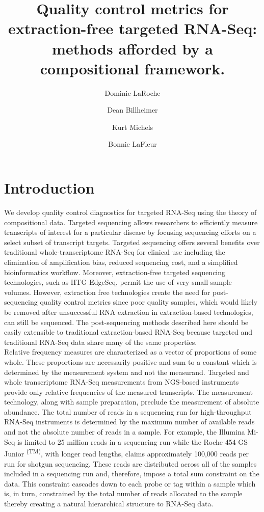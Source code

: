 \documentclass{article}\usepackage[]{graphicx}\usepackage[]{color}
\title{Quality control metrics for extraction-free targeted RNA-Seq: methods afforded by a compositional framework.}
\author{Dominic LaRoche \and Dean Billheimer \and Kurt Michels \and  Bonnie LaFleur}
\theoremstyle{definition}
\begin{document}
\maketitle

\doublespacing


\section{Introduction}


We develop quality control diagnostics for targeted RNA-Seq using the theory of compositional data.  Targeted sequencing allows researchers to efficiently measure transcripts of interest for a particular disease by focusing sequencing efforts on a select subset of transcript targets.  Targeted sequencing offers several benefits over traditional whole-transcriptome RNA-Seq for clinical use including the elimination of amplification bias, reduced sequencing cost, and a simplified bioinformatics workflow.  Moreover, extraction-free targeted sequencing technologies, such as HTG EdgeSeq, permit the use of very small sample volumes. However, extraction free technologies create the need for post-sequencing quality control metrics since poor quality samples, which would likely be removed after unsuccessful RNA extraction in extraction-based technologies, can still be sequenced.  The post-sequencing methods described here should be easily extensible to traditional extraction-based RNA-Seq because targeted and traditional RNA-Seq data share many of the same properties.\\


Relative frequency measures are characterized as a vector of proportions of some whole.  These proportions are necessarily positive and sum to a constant which is determined by the measurement system and not the measurand.  
Targeted and whole transcriptome RNA-Seq measurements from NGS-based instruments provide only relative frequencies of the measured transcripts.  The measurement technology, along with sample preparation, preclude the measurement of absolute abundance. The total number of reads in a sequencing run for high-throughput RNA-Seq instruments is determined by the maximum number of available reads  and not the absolute number of reads in a sample.  For example, the Illumina Mi-Seq is limited to 25 million reads in a sequencing run while the Roche 454 GS Junior \textsuperscript{(TM)}, with longer read lengths, claims approximately 100,000 reads per run for shotgun sequencing.  These reads are distributed across all of the samples included in a sequencing run and, therefore, impose a total sum constraint on the data.  This constraint cascades down to each probe or tag within a sample which is, in turn, constrained by the total number of reads allocated to the sample thereby creating a natural hierarchical structure to RNA-Seq data.\\
\end{document}
